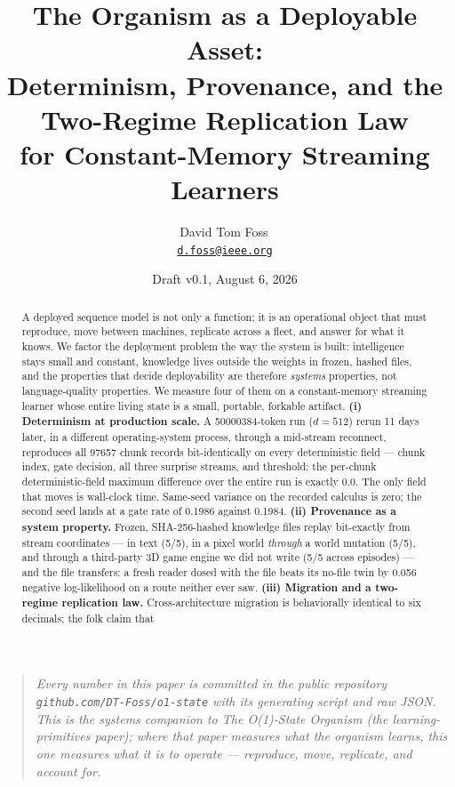 \documentclass[11pt]{article}
\title{\bfseries The Organism as a Deployable Asset:\\
Determinism, Provenance, and the Two-Regime Replication Law\\
for Constant-Memory Streaming Learners}
\author{David Tom Foss\,\orcidlink{0009-0004-0289-7154}\\[3pt]
{\normalsize\href{mailto:d.foss@ieee.org}{\texttt{d.foss@ieee.org}}}}
\date{Draft v0.1, August 6, 2026}
\theoremstyle{definition}
\newcommand{\code}[1]{\texttt{#1}}
\begin{document}
\maketitle

\begin{quote}
\raggedright
\itshape
Every number in this paper is committed in the public repository
\code{github.com/DT-Foss/o1-state} with its generating script and raw JSON.
This is the systems companion to \emph{The O(1)-State Organism} (the
learning-primitives paper); where that paper measures what the organism
learns, this one measures what it is to operate --- reproduce, move,
replicate, and account for.
\end{quote}

\begin{abstract}
A deployed sequence model is not only a function; it is an operational
object that must reproduce, move between machines, replicate across a fleet,
and answer for what it knows. We factor the deployment problem the way the
system is built: intelligence stays small and constant, knowledge lives
outside the weights in frozen, hashed files, and the properties that decide
deployability are therefore \emph{systems} properties, not language-quality
properties. We measure four of them on a constant-memory streaming learner
whose entire living state is a small, portable, forkable artifact.
\textbf{(i) Determinism at production scale.} A \num{50000384}-token run
($d{=}512$) rerun 11 days later, in a different operating-system process,
through a mid-stream reconnect, reproduces all \num{97657} chunk records
bit-identically on every deterministic field --- chunk index, gate decision,
all three surprise streams, and threshold: the per-chunk deterministic-field
maximum difference over the entire run is exactly \num{0.0}. The only field
that moves is wall-clock time. Same-seed variance on the recorded calculus is
zero; the second seed lands at a gate rate of \num{0.1986} against
\num{0.1984}. \textbf{(ii) Provenance as a system property.} Frozen,
SHA-256-hashed knowledge files replay bit-exactly from stream coordinates ---
in text (5/5), in a pixel world \emph{through} a world mutation (5/5), and
through a third-party 3D game engine we did not write (5/5 across episodes) ---
and the file transfers: a fresh reader dosed with the file beats its no-file
twin by \num{0.056} negative log-likelihood on a route neither ever saw.
\textbf{(iii) Migration and a two-regime replication law.} Cross-architecture
migration is behaviorally identical to six decimals; the folk claim that

\end{abstract}
\end{document}
